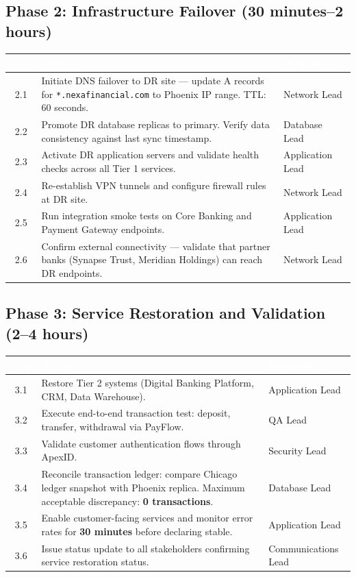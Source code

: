 \documentclass[a4paper,11pt]{article}
\begin{document}
\subsection{Phase 2: Infrastructure Failover (30 minutes--2 hours)}

\begin{tabularx}{\textwidth}{@{}c X l@{}}
  \toprule
  \rowcolor{tablehead}
  \textcolor{white}{\textbf{Step}} & \textcolor{white}{\textbf{Action}} & \textcolor{white}{\textbf{Responsible}}\\
  \midrule
  2.1 & Initiate DNS failover to DR site --- update A records for \texttt{*.nexafinancial.com} to Phoenix IP range. TTL: 60 seconds. & Network Lead\\
  \rowcolor{tablerow}
  2.2 & Promote DR database replicas to primary. Verify data consistency against last sync timestamp. & Database Lead\\
  2.3 & Activate DR application servers and validate health checks across all Tier 1 services. & Application Lead\\
  \rowcolor{tablerow}
  2.4 & Re-establish VPN tunnels and configure firewall rules at DR site. & Network Lead\\
  2.5 & Run integration smoke tests on Core Banking and Payment Gateway endpoints. & Application Lead\\
  \rowcolor{tablerow}
  2.6 & Confirm external connectivity --- validate that partner banks (Synapse Trust, Meridian Holdings) can reach DR endpoints. & Network Lead\\
  \bottomrule
\end{tabularx}

\subsection{Phase 3: Service Restoration and Validation (2--4 hours)}

\begin{tabularx}{\textwidth}{@{}c X l@{}}
  \toprule
  \rowcolor{tablehead}
  \textcolor{white}{\textbf{Step}} & \textcolor{white}{\textbf{Action}} & \textcolor{white}{\textbf{Responsible}}\\
  \midrule
  3.1 & Restore Tier 2 systems (Digital Banking Platform, CRM, Data Warehouse). & Application Lead\\
  \rowcolor{tablerow}
  3.2 & Execute end-to-end transaction test: deposit, transfer, withdrawal via PayFlow. & QA Lead\\
  3.3 & Validate customer authentication flows through ApexID. & Security Lead\\
  \rowcolor{tablerow}
  3.4 & Reconcile transaction ledger: compare Chicago ledger snapshot with Phoenix replica. Maximum acceptable discrepancy: \textbf{0 transactions}. & Database Lead\\
  3.5 & Enable customer-facing services and monitor error rates for \textbf{30 minutes} before declaring stable. & Application Lead\\
  \rowcolor{tablerow}
  3.6 & Issue status update to all stakeholders confirming service restoration status. & Communications Lead\\
  \bottomrule
\end{tabularx}
\end{document}
